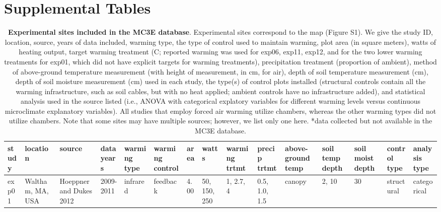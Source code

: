 \documentclass{article}
\begin{document}
\section* {Supplemental Tables} 
\begin{landscape}
\begin{footnotesize} 
\begin{table}[ht]
\centering
\caption{\textbf{Experimental sites included in the MC3E database}. Experimental sites correspond to the map (Figure S1). We give the study ID, location, source, years of data included, warming type, the type of control used to maintain warming, plot area (in square meters), watts of heating output, target warming treatment (\degree C; reported warming was used for exp06, exp11, exp12, and for the two lower warming treatments for exp01, which did not have explicit targets for warming treatments), precipitation treatment (proportion of ambient), method of above-ground temperature measurement (with height of measurement, in cm, for air), depth of soil temperature measurement (cm), depth of soil moisture measurement (cm) used in each study, the type(s) of control plots installed (structural controls contain all the warming infrastructure, such as soil cables, but with no heat applied; ambient controls have no infrastructure added), and statistical analysis used in the source listed (i.e., ANOVA with categorical explatory variables for different warming levels versus continuous microclimate explanatory variables). All studies that employ forced air warming utilize chambers, whereas the other warming types did not utilize chambers. Note that some sites may have multiple sources; however, we list only one here. *data collected but not available in the MC3E database.} 
\label{tab:methods}
\begingroup\footnotesize
\begin{tabular}{|p{}|p{}|p{}|p{}|p{}|p{}|p{}|p{}|p{}|p{}|p{}|p{}|p{}|p{}|p{}|}
  \hline
study & location & source & data years & warming type & warming control & area & watts & warming trtmt & precip trtmt & above-ground temp & soil temp depth & soil moist depth & control type & analysis type \\ 
  \hline
exp01 & Waltham, MA, USA & Hoeppner and Dukes 2012 & 2009-2011 & infrared & feedback & 4.00 & 50, 150, 250 & 1, 2.7, 4 & 0.5, 1.0, 1.5 & canopy & 2, 10 & 30 & structural & categorical \\ 

\end{tabular}
\end{table}
\end{footnotesize}
\end{landscape}
\end{document}
